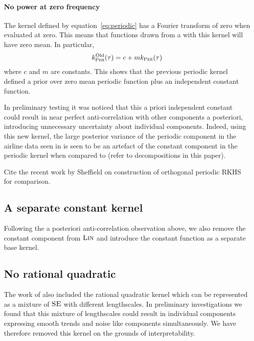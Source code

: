 \documentclass{article}
\begin{document}
\paragraph{No power at zero frequency}

The kernel defined by equation~\eqref{eq:periodic} has a Fourier transform of zero when evaluated at zero.
This means that functions drawn from a \gp{} with this kernel will have zero mean.
In particular,
\begin{equation}
k^\textrm{Old}_{\textsc{Per}}(\tau) = c + mk_{\textsc{Per}}(\tau)
\end{equation}
where $c$ and $m$ are constants.
This shows that the previous periodic kernel defined a prior over zero mean periodic function plus an independent constant function.

In preliminary testing it was noticed that this a priori independent constant could result in near perfect anti-correlation with other components a posteriori, introducing unnecessary uncertainty about individual components.
Indeed, using this new kernel, the large posterior variance of the periodic component in the airline data seen in \cite{DuvLloGroetal13} is seen to be an artefact of the constant component in the periodic kernel when compared to (refer to decompositions in this paper).

Cite the recent work by Sheffield on construction of orthogonal periodic RKHS for comparison.

\subsection{A separate constant kernel}

Following the a posteriori anti-correlation observation above, we also remove the constant component from ${\textsc{Lin}}$ and introduce the constant function as a separate base kernel.

\subsection{No rational quadratic}

The work of \cite{DuvLloGroetal13} also included the rational quadratic kernel which can be represented as a mixture of ${\textsc{SE}}$ with different lengthscales.
In preliminary investigations we found that this mixture of lengthscales could result in individual components expressing smooth trends and noise like components simultaneously.
We have therefore removed this kernel on the grounds of interpretability.
\end{document}
